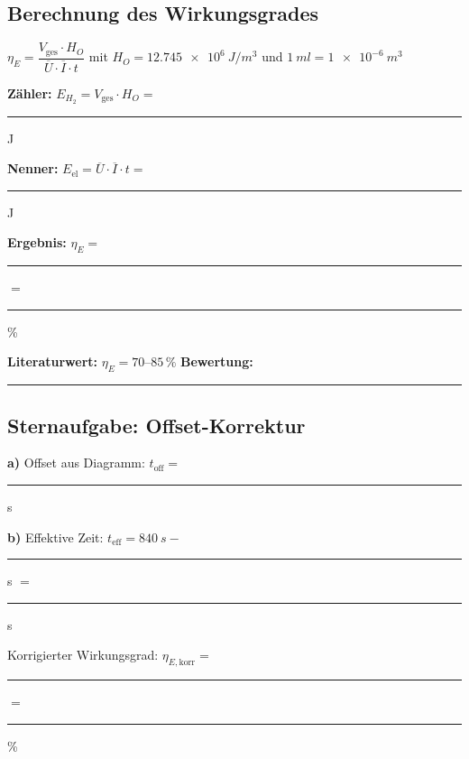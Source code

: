 \documentclass[11pt,a4paper]{scrartcl}
\begin{document}
	\subsection*{Berechnung des Wirkungsgrades}
	
	\begin{tcolorbox}[colback=white, colframe=blue!75!black]
		$\eta_E = \dfrac{V_{\text{ges}} \cdot H_O}{\overline{U} \cdot \overline{I} \cdot t}$ \qquad mit $H_O = \SI{12,745e6}{J/m^3}$ und $\SI{1}{ml} = \SI{1e-6}{m^3}$
	\end{tcolorbox}
	
	\vspace{0.5cm}
	
	\textbf{Zähler:} \quad $E_{H_2} = V_{\text{ges}} \cdot H_O = $ \rule{6cm}{0.4pt} J
	
	\vspace{0.7cm}
	
	\textbf{Nenner:} \quad $E_{\text{el}} = \overline{U} \cdot \overline{I} \cdot t = $ \rule{6cm}{0.4pt} J
	
	\vspace{0.7cm}
	
	\textbf{Ergebnis:} \quad $\eta_E = $ \rule{3cm}{0.4pt} $= $ \rule{2cm}{0.4pt} \%
	
	\vspace{0.7cm}
	
	\begin{tcolorbox}[colback=white, colframe=gray!75!black]
		\textbf{Literaturwert:} $\eta_E = 70$--$85\,\%$ \hfill \textbf{Bewertung:} \rule{4cm}{0.4pt}
	\end{tcolorbox}
	
	\subsection*{Sternaufgabe: Offset-Korrektur}
	
	\textbf{a)} Offset aus Diagramm: \quad $t_{\text{off}} = $ \rule{2cm}{0.4pt} s
	
		\vspace{0.7cm}
	
	\textbf{b)} Effektive Zeit: \quad $t_{\text{eff}} = \SI{840}{s} - $ \rule{1.5cm}{0.4pt} s $= $ \rule{2cm}{0.4pt} s
	
	\vspace{0.7cm}
	
	\hspace{0.5cm} Korrigierter Wirkungsgrad: \quad $\eta_{E,\text{korr}} = $ \rule{3cm}{0.4pt} $= $ \rule{2cm}{0.4pt} \%
	
\end{document}
